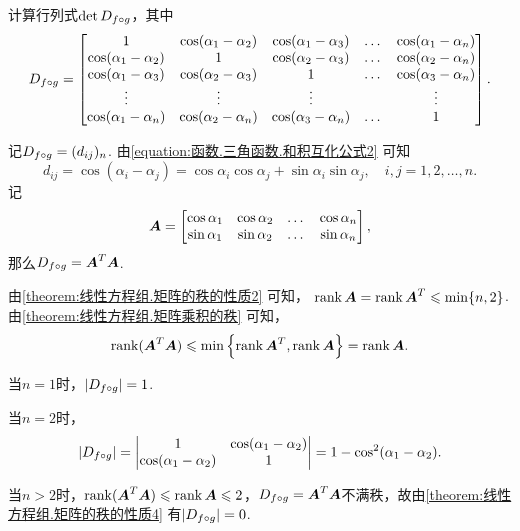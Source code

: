 \begin{example}
计算行列式\(\det D_{f \circ g}\)，其中\[
D_{f \circ g} = \begin{bmatrix}
1 & \cos(\alpha_1-\alpha_2) & \cos(\alpha_1-\alpha_3) & \dots & \cos(\alpha_1-\alpha_n) \\
\cos(\alpha_1-\alpha_2) & 1 & \cos(\alpha_2-\alpha_3) & \dots & \cos(\alpha_2-\alpha_n) \\
\cos(\alpha_1-\alpha_3) & \cos(\alpha_2-\alpha_3) & 1 & \dots & \cos(\alpha_3-\alpha_n) \\
\vdots & \vdots & \vdots & & \vdots \\
\cos(\alpha_1-\alpha_n) & \cos(\alpha_2-\alpha_n) & \cos(\alpha_3-\alpha_n) & \dots & 1
\end{bmatrix}.
\]
\begin{solution}
记\(D_{f \circ g} = (d_{ij})_n\).
由\cref{equation:函数.三角函数.和积互化公式2} 可知\[
d_{ij} = \cos(\alpha_i-\alpha_j)
= \cos\alpha_i\cos\alpha_j+\sin\alpha_i\sin\alpha_j,
\quad i,j=1,2,\dotsc,n.
\]记\[
\boldsymbol{A} = \begin{bmatrix}
\cos\alpha_1 & \cos\alpha_2 & \dots & \cos\alpha_n \\
\sin\alpha_1 & \sin\alpha_2 & \dots & \sin\alpha_n
\end{bmatrix},
\]那么\(D_{f \circ g} = \boldsymbol{A}^T \boldsymbol{A}\).

由\cref{theorem:线性方程组.矩阵的秩的性质2} 可知，%
\(\rank\boldsymbol{A} = \rank\boldsymbol{A}^T \leqslant \min\{n,2\}\).
由\cref{theorem:线性方程组.矩阵乘积的秩} 可知，\[
\rank(\boldsymbol{A}^T\boldsymbol{A}) \leqslant \min\left\{\rank\boldsymbol{A}^T,\rank\boldsymbol{A}\right\} = \rank\boldsymbol{A}.
\]

当\(n=1\)时，\(\abs{D_{f \circ g}}=1\).

当\(n=2\)时，\[
\abs{D_{f \circ g}} = \begin{vmatrix}
1 & \cos(\alpha_1-\alpha_2) \\
\cos(\alpha_1-\alpha_2) & 1
\end{vmatrix} = 1 - \cos^2(\alpha_1-\alpha_2).
\]

当\(n>2\)时，\(\rank(\boldsymbol{A}^T\boldsymbol{A}) \leqslant \rank\boldsymbol{A} \leqslant2\)，\(D_{f \circ g} = \boldsymbol{A}^T \boldsymbol{A}\)不满秩，故由\cref{theorem:线性方程组.矩阵的秩的性质4} 有\(\abs{D_{f \circ g}}=0\).
\end{solution}
\end{example}

